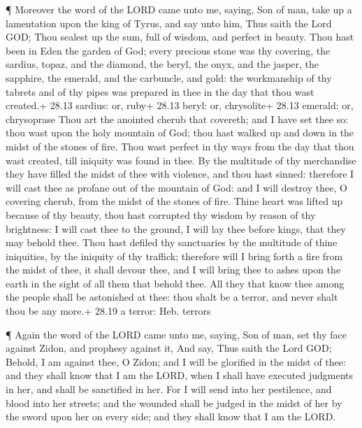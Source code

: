 ¶ Moreover the word of the LORD came unto me, saying,
 Son of man, take up a lamentation upon the king of Tyrus,
and say unto him, Thus saith the Lord GOD; Thou sealest up the sum, full
of wisdom, and perfect in beauty.  Thou hast been in Eden
the garden of God; every precious stone was thy covering, the sardius,
topaz, and the diamond, the beryl, the onyx, and the jasper, the
sapphire, the emerald, and the carbuncle, and gold: the workmanship of
thy tabrets and of thy pipes was prepared in thee in the day that thou
wast created.+ 28.13 sardius: or, ruby+ 28.13 beryl: or, chrysolite+
28.13 emerald: or, chrysoprase  Thou art the anointed
cherub that covereth; and I have set thee so: thou wast upon the holy
mountain of God; thou hast walked up and down in the midst of the stones
of fire.  Thou wast perfect in thy ways from the day that
thou wast created, till iniquity was found in thee.  By the
multitude of thy merchandise they have filled the midst of thee with
violence, and thou hast sinned: therefore I will cast thee as profane
out of the mountain of God: and I will destroy thee, O covering cherub,
from the midst of the stones of fire.  Thine heart was
lifted up because of thy beauty, thou hast corrupted thy wisdom by
reason of thy brightness: I will cast thee to the ground, I will lay
thee before kings, that they may behold thee.  Thou hast
defiled thy sanctuaries by the multitude of thine iniquities, by the
iniquity of thy traffick; therefore will I bring forth a fire from the
midst of thee, it shall devour thee, and I will bring thee to ashes upon
the earth in the sight of all them that behold thee.  All
they that know thee among the people shall be astonished at thee: thou
shalt be a terror, and never shalt thou be any more.+ 28.19 a terror:
Heb. terrors

 ¶ Again the word of the LORD came unto me, saying,
 Son of man, set thy face against Zidon, and prophesy
against it,  And say, Thus saith the Lord GOD; Behold, I am
against thee, O Zidon; and I will be glorified in the midst of thee: and
they shall know that I am the LORD, when I shall have executed judgments
in her, and shall be sanctified in her.  For I will send
into her pestilence, and blood into her streets; and the wounded shall
be judged in the midst of her by the sword upon her on every side; and
they shall know that I am the LORD.

